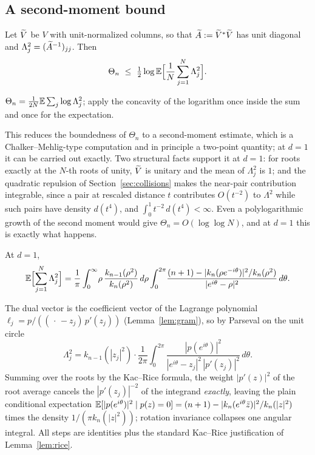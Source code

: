\subsection{A second-moment bound}

\begin{lemma}\label{lem:jensen}
  Let $\widetilde V$ be $V$ with unit-normalized columns, so that $\widetilde A := \widetilde V^*\widetilde V$ has
  unit diagonal and $\Lambda_j^2 = (\widetilde A^{-1})_{jj}$. Then
  \[
    \Theta_n \ \le\ \tfrac12\log\E\Bigl[\frac1N\sum_{j=1}^N\Lambda_j^2\Bigr].
  \]
\end{lemma}

\proof
$\Theta_n = \frac1{2N}\mathbb{E}\sum_j\log\Lambda_j^2$; apply the concavity of the logarithm once
inside the sum and once for the expectation.
\endproof

This reduces the boundedness of $\Theta_n$ to a second-moment estimate, which is a
Chalker--Mehlig-type computation \cite{chalker1998eigenvector} and in principle a two-point
quantity; at $d=1$ it can be carried out exactly. Two structural facts support it at $d=1$:
for roots exactly at the $N$-th roots of unity, $\widetilde V$ is unitary and the mean of
$\Lambda_j^2$ is $1$; and the quadratic repulsion of Section~\ref{sec:collisions} makes the
near-pair contribution integrable, since a pair at rescaled distance $t$ contributes
$O(t^{-2})$ to $\Lambda^2$ while such pairs have density $d(t^4)$, and
$\int_0^1t^{-2}\,d(t^4)<\infty$. Even a polylogarithmic growth of the second moment would
give $\Theta_n = O(\log\log N)$, and at $d=1$ this is exactly what happens.

\begin{lemma}\label{lem:secondmoment}
  At $d=1$,
  \[
    \mathbb{E}\Bigl[\sum_{j=1}^N\Lambda_j^2\Bigr]
    = \frac1\pi\int_0^\infty\!\rho\,\frac{k_{n-1}(\rho^2)}{k_n(\rho^2)}\,d\rho
      \int_0^{2\pi}\!\frac{(n+1) - |k_n(\rho e^{-i\theta})|^2/k_n(\rho^2)}
      {|e^{i\theta}-\rho|^2}\,d\theta.
  \]
\end{lemma}

\proof
The dual vector is the coefficient vector of the Lagrange polynomial
$\ell_j = p/((\,\cdot\,-z_j)\,p'(z_j))$ (Lemma~\ref{lem:gram}), so by Parseval on the unit
circle
\[
  \Lambda_j^2 = k_{n-1}(|z_j|^2)\cdot\frac1{2\pi}\int_0^{2\pi}
  \frac{|p(e^{i\theta})|^2}{|e^{i\theta}-z_j|^2\,|p'(z_j)|^2}\,d\theta.
\]
Summing over the roots by the Kac--Rice formula, the weight $|p'(z)|^2$ of the root average
cancels the $|p'(z_j)|^{-2}$ of the integrand \emph{exactly}, leaving the plain conditional
expectation
$\mathbb{E}[|p(e^{i\theta})|^2 \mid p(z)=0] = (n+1) - |k_n(e^{i\theta}\bar z)|^2/k_n(|z|^2)$ times
the density $1/(\pi k_n(|z|^2))$; rotation invariance collapses one angular integral. All
steps are identities plus the standard Kac--Rice justification of Lemma~\ref{lem:rice}.
\endproof

